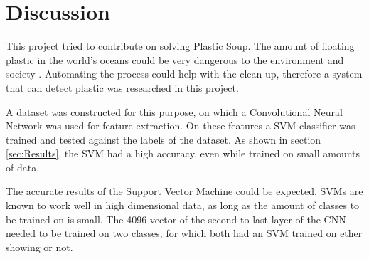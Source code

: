 \section{Discussion}
\label{sec:Discussion}
This project tried to contribute on solving Plastic Soup.
The amount of floating plastic in the world's oceans could be very dangerous to the environment and society \citet{moore2011plastic}.
Automating the process could help with the clean-up, therefore a system that can detect plastic was researched in this project.

A dataset was constructed for this purpose, on which a Convolutional Neural Network was used for feature extraction.
On these features a SVM classifier was trained and tested against the labels of the dataset.
As shown in section \ref{sec:Results}, the SVM had a high accuracy, even while trained on small amounts of data.




The accurate results of the Support Vector Machine could be expected.
SVMs are known to work well in high dimensional data, as long as the amount of classes to be trained on is small.
The 4096 vector of the second-to-last layer of the CNN needed to be trained on two classes, for which both had an SVM trained on ether showing or not.

